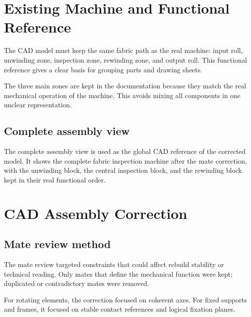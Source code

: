 \section{Existing Machine and Functional Reference}

The CAD model must keep the same fabric path as the real machine: input roll, unwinding zone, inspection zone, rewinding zone, and output roll. This functional reference gives a clear basis for grouping parts and drawing sheets.

The three main zones are kept in the documentation because they match the real mechanical operation of the machine. This avoids mixing all components in one unclear representation.

\subsection{Complete assembly view}

The complete assembly view is used as the global CAD reference of the corrected model. It shows the complete fabric inspection machine after the mate correction, with the unwinding block, the central inspection block, and the rewinding block kept in their real functional order.

\section{CAD Assembly Correction}

\subsection{Mate review method}

The mate review targeted constraints that could affect rebuild stability or technical reading. Only mates that define the mechanical function were kept; duplicated or contradictory mates were removed.

For rotating elements, the correction focused on coherent axes. For fixed supports and frames, it focused on stable contact references and logical fixation planes.

